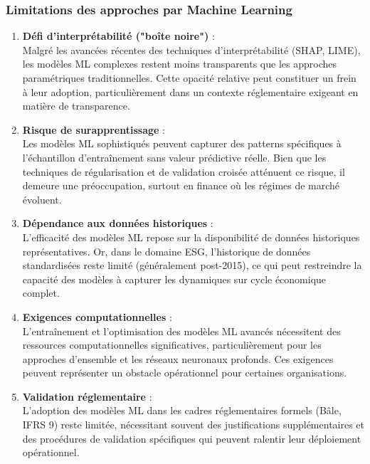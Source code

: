 \subsubsection{Limitations des approches par Machine Learning}

\begin{enumerate}
  \item \textbf{Défi d'interprétabilité ("boîte noire")} : \\
  Malgré les avancées récentes des techniques d'interprétabilité (SHAP, LIME), les modèles ML complexes restent moins transparents que les approches paramétriques traditionnelles. Cette opacité relative peut constituer un frein à leur adoption, particulièrement dans un contexte réglementaire exigeant en matière de transparence.

  \item \textbf{Risque de surapprentissage} : \\
  Les modèles ML sophistiqués peuvent capturer des patterns spécifiques à l'échantillon d'entraînement sans valeur prédictive réelle. Bien que les techniques de régularisation et de validation croisée atténuent ce risque, il demeure une préoccupation, surtout en finance où les régimes de marché évoluent.

  \item \textbf{Dépendance aux données historiques} : \\
  L'efficacité des modèles ML repose sur la disponibilité de données historiques représentatives. Or, dans le domaine ESG, l'historique de données standardisées reste limité (généralement post-2015), ce qui peut restreindre la capacité des modèles à capturer les dynamiques sur cycle économique complet.

  \item \textbf{Exigences computationnelles} : \\
  L'entraînement et l'optimisation des modèles ML avancés nécessitent des ressources computationnelles significatives, particulièrement pour les approches d'ensemble et les réseaux neuronaux profonds. Ces exigences peuvent représenter un obstacle opérationnel pour certaines organisations.

  \item \textbf{Validation réglementaire} : \\
  L'adoption des modèles ML dans les cadres réglementaires formels (Bâle, IFRS 9) reste limitée, nécessitant souvent des justifications supplémentaires et des procédures de validation spécifiques qui peuvent ralentir leur déploiement opérationnel.
\end{enumerate}

